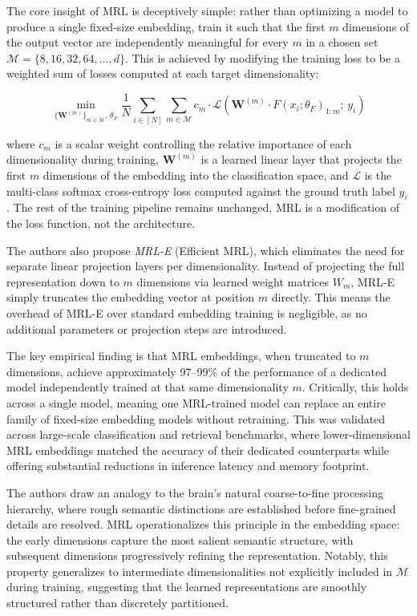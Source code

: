 \documentclass[a4paper,12pt]{article}
\begin{document}
The core insight of MRL is deceptively simple: rather than optimizing a model to 
produce a single fixed-size embedding, train it such that the first $m$ dimensions 
of the output vector are independently meaningful for every $m$ in a chosen set 
$\mathcal{M} = \{8, 16, 32, 64, \ldots, d\}$. This is achieved by modifying the 
training loss to be a weighted sum of losses computed at each target dimensionality:

\begin{equation}
    \min_{\{\mathbf{W}^{(m)}\}_{m \in \mathcal{M}},\, \theta_F} 
    \frac{1}{N} \sum_{i \in [N]} \sum_{m \in \mathcal{M}} 
    c_m \cdot \mathcal{L}\!\left(\mathbf{W}^{(m)} \cdot F(x_i; \theta_F)_{1:m};\, y_i\right)
\end{equation}

where $c_m$ is a scalar weight controlling the relative importance of each 
dimensionality during training, $\mathbf{W}^{(m)}$ is a learned linear layer 
that projects the first $m$ dimensions of the embedding into the classification 
space, and $\mathcal{L}$ is the multi-class softmax cross-entropy loss computed 
against the ground truth label $y_i$. The rest of the training pipeline remains 
unchanged, MRL is a modification of the loss function, not the architecture.

The authors also propose \textit{MRL-E} (Efficient MRL), which eliminates the need 
for separate linear projection layers per dimensionality. Instead of projecting the 
full representation down to $m$ dimensions via learned weight matrices $W_m$, MRL-E 
simply truncates the embedding vector at position $m$ directly. This means the 
overhead of MRL-E over standard embedding training is negligible, as no additional 
parameters or projection steps are introduced.

The key empirical finding is that MRL embeddings, when truncated to $m$ dimensions, 
achieve approximately 97--99\% of the performance of a dedicated model independently 
trained at that same dimensionality $m$. Critically, this holds across a single 
model, meaning one MRL-trained model can replace an entire family of fixed-size 
embedding models without retraining. This was validated across large-scale 
classification and retrieval benchmarks, where lower-dimensional MRL embeddings 
matched the accuracy of their dedicated counterparts while offering substantial 
reductions in inference latency and memory footprint.

The authors draw an analogy to the brain's natural coarse-to-fine processing 
hierarchy, where rough semantic distinctions are established before fine-grained 
details are resolved. MRL operationalizes this principle in the embedding space: the 
early dimensions capture the most salient semantic structure, with subsequent 
dimensions progressively refining the representation. Notably, this property 
generalizes to intermediate dimensionalities not explicitly included in $\mathcal{M}$ 
during training, suggesting that the learned representations are smoothly structured 
rather than discretely partitioned.
\end{document}
